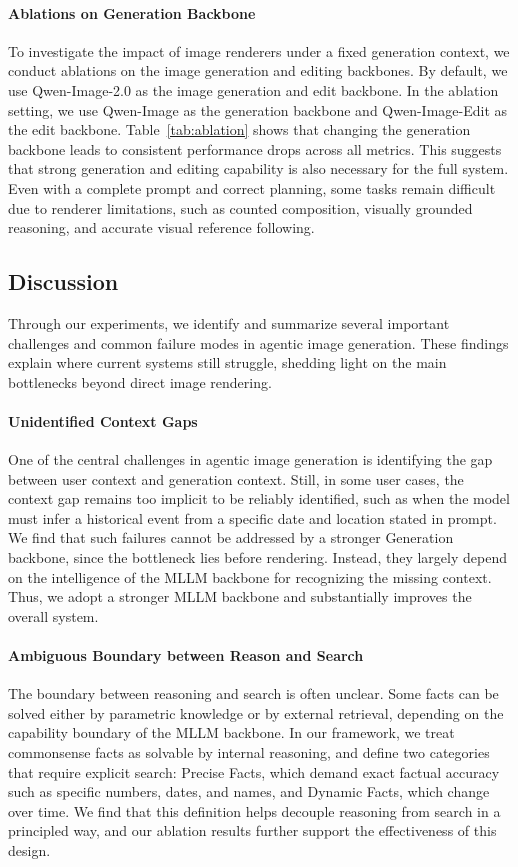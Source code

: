 \paragraph{Ablations on Generation Backbone}
To investigate the impact of image renderers under a fixed generation context, we conduct ablations on the image generation and editing backbones. By default, we use Qwen-Image-2.0 as the image generation and edit backbone. In the ablation setting, we use Qwen-Image as the generation backbone and Qwen-Image-Edit as the edit backbone. Table~\ref{tab:ablation} shows that changing the generation backbone leads to consistent performance drops across all metrics. This suggests that strong generation and editing capability is also necessary for the full system. Even with a complete prompt and correct planning, some tasks remain difficult due to renderer limitations, such as counted composition, visually grounded reasoning, and accurate visual reference following.

\subsection{Discussion}
Through our experiments, we identify and summarize several important challenges and common failure modes in agentic image generation. These findings explain where current systems still struggle, shedding light on the main bottlenecks beyond direct image rendering.

\paragraph{Unidentified Context Gaps}
One of the central challenges in agentic image generation is identifying the gap between user context and generation context. Still, in some user cases, the context gap remains too implicit to be reliably identified, such as when the model must infer a historical event from a specific date and location stated in prompt. We find that such failures cannot be addressed by a stronger Generation backbone, since the bottleneck lies before rendering. Instead, they largely depend on the intelligence of the MLLM backbone for recognizing the missing context. Thus, we adopt a stronger MLLM backbone and substantially improves the overall system.

\paragraph{Ambiguous Boundary between Reason and Search}
The boundary between reasoning and search is often unclear. Some facts can be solved either by parametric knowledge or by external retrieval, depending on the capability boundary of the MLLM backbone. In our framework, we treat commonsense facts as solvable by internal reasoning, and define two categories that require explicit search: Precise Facts, which demand exact factual accuracy such as specific numbers, dates, and names, and Dynamic Facts, which change over time. We find that this definition helps decouple reasoning from search in a principled way, and our ablation results further support the effectiveness of this design.

